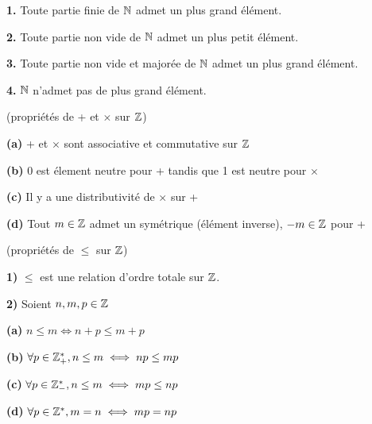 \documentclass[a4paper, 12pt]{article}
\begin{document}
\begin{theorem}
    \item \textbf{1.} Toute partie finie de $\mathbb{N}$ admet un plus grand élément.
    \item \textbf{2.} Toute partie non vide de $\mathbb{N}$ admet un plus petit élément.
    \item \textbf{3.} Toute partie non vide et majorée de $\mathbb{N}$ admet un plus grand élément.
    \item \textbf{4.} $\mathbb{N}$ n'admet pas de plus grand élément.
\end{theorem}

\begin{theorem}
    (propriétés de + et $\times$ sur $\mathbb{Z}$)
    \item \textbf{(a)} + et $\times$ sont associative et commutative sur $\mathbb{Z}$

    \item \textbf{(b)} 0 est élement neutre pour + tandis que 1 est neutre pour $\times$

    \item \textbf{(c)} Il y a une distributivité de $\times$ sur +

    \item \textbf{(d)} Tout $m \in \mathbb{Z}$ admet un symétrique (élément inverse), $-m \in \mathbb{Z}$ pour +
\end{theorem}

\begin{theorem}
    (propriétés de $\leq$ sur $\mathbb{Z}$)

    \item \textbf{1)} $\leq$ est une relation d'ordre totale sur $\mathbb{Z}$.
    
    \item \textbf{2)} Soient $n, m, p \in \mathbb{Z}$
    
    \item \textbf{(a)} $n \leq m \iff n + p \leq m + p$
    \item \textbf{(b)} $\forall p \in \mathbb{Z}_+^*, n \leq m \iff np \leq mp$
    \item \textbf{(c)} $\forall p \in \mathbb{Z}_-^*, n \leq m \iff mp \leq np$
    \item \textbf{(d)} $\forall p \in \mathbb{Z}^*, m = n \iff mp = np$
\end{theorem}
\end{document}
